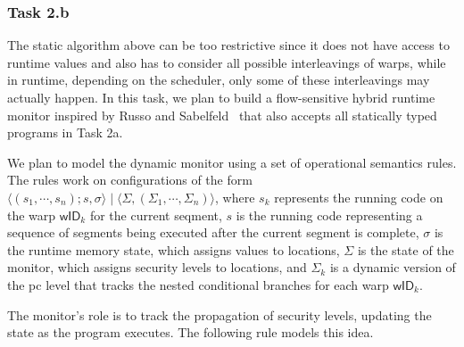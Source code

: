 \subsubsection{Task 2.b} 
The static algorithm above can be too restrictive since it does not have access to runtime values and also has to consider all possible interleavings of warps, while in runtime, depending on the scheduler, only some of these interleavings may actually happen. 
%
In this task, we plan to build a flow-sensitive hybrid runtime monitor inspired by Russo and Sabelfeld~\cite{russo2010CSF}
that also accepts all statically typed programs in Task 2a.
%

We plan to model the dynamic monitor using a set of operational semantics rules.
%
The rules work on configurations of the form $\langle (s_1, \cdots, s_n); s, \sigma \rangle  \mid \langle \Sigma, (\Sigma_1, \cdots, \Sigma_n)\rangle$, where $s_k$ represents the running code on the warp $\mathsf{wID}_k$ for the current seqment, $s$ is the running code representing a sequence of segments being executed after the current segment is complete, $\sigma$ is the runtime memory state, which assigns values to locations,  $\Sigma $ is the state of the monitor, which  assigns security levels to locations, 
and $\Sigma_k$ is a dynamic version of the pc level that tracks the nested conditional branches for each warp $\mathsf{wID}_k$.
%

The monitor's role is to track the propagation of security levels, updating the state as the program executes.
%
The following rule models this idea.


